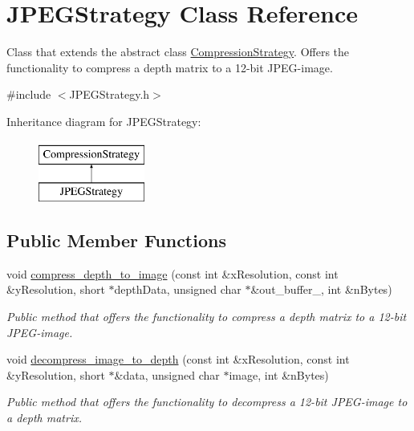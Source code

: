 \hypertarget{class_j_p_e_g_strategy}{\section{J\+P\+E\+G\+Strategy Class Reference}
\label{class_j_p_e_g_strategy}
}


Class that extends the abstract class \hyperlink{class_compression_strategy}{Compression\+Strategy}. Offers the functionality to compress a depth matrix to a 12-\/bit J\+P\+E\+G-\/image.  




{\ttfamily \#include $<$J\+P\+E\+G\+Strategy.\+h$>$}

Inheritance diagram for J\+P\+E\+G\+Strategy\+:\begin{figure}[H]
\begin{center}
\leavevmode
\includegraphics[height=2.000000cm]{class_j_p_e_g_strategy}
\end{center}
\end{figure}
\subsection*{Public Member Functions}
\begin{DoxyCompactItemize}
\item 
void \hyperlink{class_j_p_e_g_strategy_a3e27b992e48e592c4b127bbeeabc87ce}{compress\+\_\+depth\+\_\+to\+\_\+image} (const int \&x\+Resolution, const int \&y\+Resolution, short $\ast$depth\+Data, unsigned char $\ast$\&out\+\_\+buffer\+\_\+, int \&n\+Bytes)
\begin{DoxyCompactList}\small\item\em Public method that offers the functionality to compress a depth matrix to a 12-\/bit J\+P\+E\+G-\/image. \end{DoxyCompactList}\item 
void \hyperlink{class_j_p_e_g_strategy_ae1005fca6a7f6ac3a1ec7e603d0af01a}{decompress\+\_\+image\+\_\+to\+\_\+depth} (const int \&x\+Resolution, const int \&y\+Resolution, short $\ast$\&data, unsigned char $\ast$image, int \&n\+Bytes)
\begin{DoxyCompactList}\small\item\em Public method that offers the functionality to decompress a 12-\/bit J\+P\+E\+G-\/image to a depth matrix. \end{DoxyCompactList}\end{DoxyCompactItemize}


